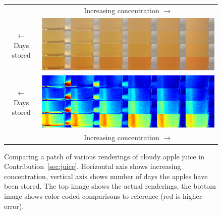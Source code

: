 \begin{figure}[t]
\centering
\begin{tabular}{@{}c@{}c@{}}
	 & Increasing concentration $\longrightarrow$ \\
	\begin{sideways}\hspace{1em}$\longleftarrow$ Days stored \end{sideways} \hspace{0.5mm} &\includegraphics[width=0.9\columnwidth]{figures/comparison_renderings.png} \\
	 \begin{sideways}\hspace{1em}$\longleftarrow$ Days stored \end{sideways} \hspace{0.5mm} &\includegraphics[width=0.9\columnwidth]{figures/comparison_diff.png}  \\
	 & Increasing concentration $\longrightarrow$

\end{tabular}
\caption{Comparing a patch of various renderings of cloudy apple juice in Contribution~\ref{sec:juice}. Horizontal axis shows increasing concentration, vertical axis shows number of days the apples have been stored. The top image shows the actual renderings, the bottom image shows color coded comparisons to reference (red is higher error).}
\label{fig:juicecomparisondetail}
\end{figure}

